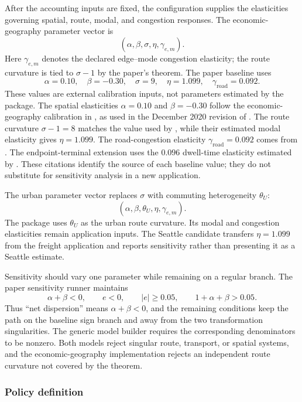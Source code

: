 After the accounting inputs are fixed, the configuration supplies the
elasticities governing spatial, route, modal, and congestion responses. The
economic-geography parameter vector is
\[
 (\alpha,\beta,\sigma,\eta,\gamma_{e,m}).
\]
Here \(\gamma_{e,m}\) denotes the declared edge--mode congestion elasticity;
the route curvature is tied to \(\sigma-1\) by the paper's theorem. The paper
baseline uses
\[
 \alpha=0.10,\quad
 \beta=-0.30,\quad
 \sigma=9,\quad
 \eta=1.099,\quad
 \gamma_{\mathrm{road}}=0.092.
\]
These values are external calibration inputs, not parameters estimated by the
package. The spatial elasticities \(\alpha=0.10\) and \(\beta=-0.30\) follow
the economic-geography calibration in \citet{AllenArkolakis2014}, as used in
the December 2020 revision of \citet{AllenArkolakis2020}. The route curvature
\(\sigma-1=8\) matches the value used by
\citet{FuchsWong2026Multimodal}, while their estimated modal elasticity gives
\(\eta=1.099\). The road-congestion elasticity
\(\gamma_{\mathrm{road}}=0.092\) comes from
\citet{AllenArkolakis2020}. The endpoint-terminal extension uses the
\(0.096\) dwell-time elasticity estimated by
\citet{FuchsWong2026Multimodal}. These citations identify the source of each
baseline value; they do not substitute for sensitivity analysis in a new
application.

The urban parameter vector replaces \(\sigma\) with commuting heterogeneity
\(\theta_U\):
\[
 (\alpha,\beta,\theta_U,\eta,\gamma_{e,m}).
\]
The package uses \(\theta_U\) as the urban route curvature. Its modal and
congestion elasticities remain application inputs. The Seattle candidate
transfers \(\eta=1.099\) from the freight application and reports sensitivity
rather than presenting it as a Seattle estimate.

Sensitivity should vary one parameter while remaining on a regular branch.
The paper sensitivity runner maintains
\[
 \alpha+\beta<0,\qquad e<0,\qquad
 |e|\geq0.05,\qquad 1+\alpha+\beta>0.05.
\]
Thus ``net dispersion'' means \(\alpha+\beta<0\), and the remaining conditions
keep the path on the baseline sign branch and away from the two transformation
singularities. The generic model builder requires the corresponding
denominators to be nonzero. Both models reject singular route, transport, or
spatial systems, and the economic-geography implementation rejects an
independent route curvature not covered by the theorem.

\subsubsection{Policy definition}


